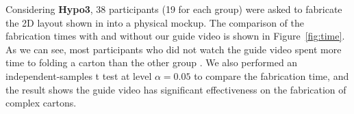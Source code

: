 Considering \textbf{Hypo3}, 38 participants (19 for each group) were asked to fabricate the 2D layout shown in  into a physical mockup. 
The comparison of the fabrication times with and without our guide video is shown in Figure~\ref{fig:time}. 
As we can see, most participants who did not watch the guide video spent more time 
 to folding a carton than the other group .
% 
%
We also performed an independent-samples t test at level $\alpha = 0.05$ to compare the fabrication time, and the result shows the guide video has significant effectiveness on the fabrication of complex cartons.




